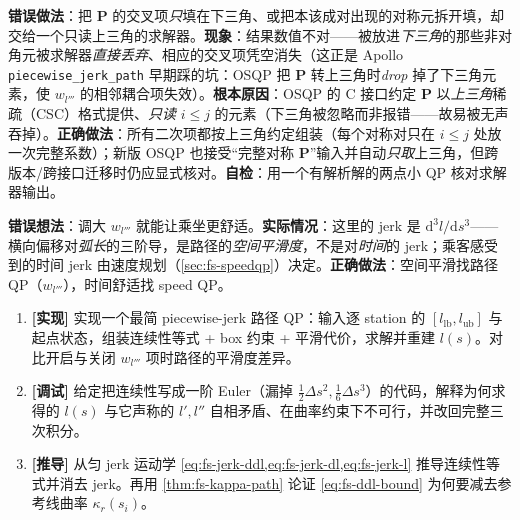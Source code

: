 \begin{pitfall}
\textbf{错误做法}：把 $\mathbf{P}$ 的交叉项\emph{只}填在下三角、或把本该成对出现的对称元拆开填，却交给一个只读上三角的求解器。\textbf{现象}：结果数值不对——被放进\emph{下三角}的那些非对角元被求解器\emph{直接丢弃}、相应的交叉项凭空消失（这正是 Apollo \texttt{piecewise\_jerk\_path} 早期踩的坑：OSQP 把 $\mathbf{P}$ 转上三角时\emph{drop} 掉了下三角元素，使 $w_{l'''}$ 的相邻耦合项失效）。\textbf{根本原因}：OSQP 的 C 接口约定 $\mathbf{P}$ 以\emph{上三角}稀疏（CSC）格式提供、\emph{只读} $i\le j$ 的元素\cite{stellato2020osqp}（下三角被忽略而非报错——故易被无声吞掉）。\textbf{正确做法}：所有二次项都按上三角约定组装（每个对称对只在 $i\le j$ 处放一次完整系数）；新版 OSQP 也接受“完整对称 $\mathbf{P}$”输入并自动\emph{只取}上三角，但跨版本/跨接口迁移时仍应显式核对。\textbf{自检}：用一个有解析解的两点小 QP 核对求解器输出。
\end{pitfall}

\begin{pitfall}
\textbf{错误想法}：调大 $w_{l'''}$ 就能让乘坐更舒适。\textbf{实际情况}：这里的 jerk 是 $\mathrm{d}^3l/\mathrm{d}s^3$——横向偏移对\emph{弧长}的三阶导，是路径的\emph{空间平滑度}，不是对\emph{时间}的 jerk；乘客感受到的时间 jerk 由速度规划（\cref{sec:fs-speedqp}）决定。\textbf{正确做法}：空间平滑找路径 QP（$w_{l'''}$），时间舒适找 speed QP。
\end{pitfall}

\begin{practice}
\begin{enumerate}
  \item \textbf{[实现]} 实现一个最简 piecewise-jerk 路径 QP：输入逐 station 的 $[l_{\mathrm{lb}},l_{\mathrm{ub}}]$ 与起点状态，组装连续性等式 + box 约束 + 平滑代价，求解并重建 $l(s)$。对比开启与关闭 $w_{l'''}$ 项时路径的平滑度差异。
  \item \textbf{[调试]} 给定把连续性写成一阶 Euler（漏掉 $\tfrac12\Delta s^2,\tfrac16\Delta s^3$）的代码，解释为何求得的 $l(s)$ 与它声称的 $l',l''$ 自相矛盾、在曲率约束下不可行，并改回完整三次积分。
  \item \textbf{[推导]} 从匀 jerk 运动学 \cref{eq:fs-jerk-ddl,eq:fs-jerk-dl,eq:fs-jerk-l} 推导连续性等式并消去 jerk。再用 \cref{thm:fs-kappa-path} 论证 \cref{eq:fs-ddl-bound} 为何要减去参考线曲率 $\kappa_r(s_i)$。
\end{enumerate}
\end{practice}

